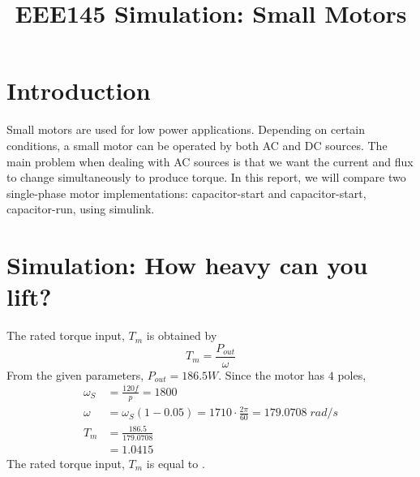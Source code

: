 \documentclass[conference]{IEEEtran}
\begin{document}
\title{EEE145 Simulation: Small Motors}

\author{
}

\maketitle


\section{Introduction}
\noindent 
Small motors are used for low power applications. Depending on certain conditions, a small motor can 
be operated by both AC and DC sources. The main problem when dealing with AC sources is that we want the
current and flux to change simultaneously to produce torque. In this report, we will compare two 
single-phase motor implementations: capacitor-start and capacitor-start, capacitor-run, using simulink. 

\vspace{8pt}
\section{Simulation: How heavy can you lift?}
\noindent 
The rated torque input, $T_{m}$ is obtained by
\begin{equation*}
T_m = \frac{P_{out}}{\omega}
\end{equation*}
\noindent 
From the given parameters, $P_{out} = 186.5W$. Since the motor has $4$ poles, 
\begin{align*}
\omega_S &= \frac{120f}{p} = 1800 \\
\omega &= \omega_S (1-0.05) = 1710 \cdot \frac{2\pi}{60} = 179.0708 \; rad/s \\ 
T_m &= \frac{186.5}{179.0708} \\ 
&= 1.0415
\end{align*}
\noindent 
The rated torque input, $T_m$ is equal to .
\end{document}
